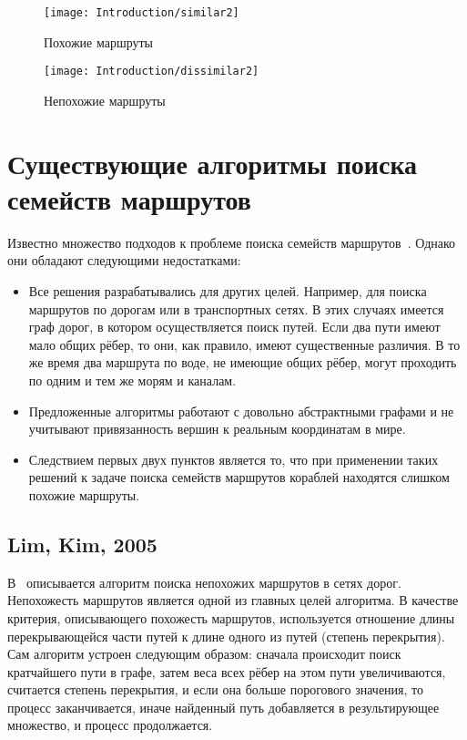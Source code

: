 \begin{figure}
    \texttt{[image: Introduction/similar2]}
    \caption{Похожие маршруты}
    \label{fig:similar-paths2}
\end{figure}

\begin{figure}
    \texttt{[image: Introduction/dissimilar2]}
    \caption{Непохожие маршруты}
    \label{fig:dissimilar-paths2}
\end{figure}

\FloatBarrier

\section{Существующие алгоритмы поиска семейств маршрутов}

\label{sec:existing-algos}

Известно множество подходов к проблеме поиска семейств
маршрутов~\cite{lim2005shortest, dial1971probabilistic, mafast}.
Однако они обладают следующими недостатками:
  
\begin{itemize}
    \item Все решения разрабатывались для других целей. Например, для
      поиска маршрутов по дорогам или в транспортных сетях. В этих
      случаях имеется граф дорог, в котором осуществляется поиск путей.
      Если два пути имеют мало общих рёбер, то они, как правило, имеют
      существенные различия. В то же время два маршрута по воде, не
      имеющие общих рёбер, могут проходить по одним и тем же морям и
      каналам.
    \item Предложенные алгоритмы работают с довольно абстрактными
      графами и не учитывают привязанность вершин к реальным координатам
      в мире.
    \item Следствием первых двух пунктов является то, что при
      применении таких решений к задаче поиска семейств маршрутов
      кораблей находятся слишком похожие маршруты.
\end{itemize}

\FloatBarrier

\subsection{Lim, Kim, 2005}

\label{subsec:lim-kim}

В~\cite{lim2005shortest} описывается алгоритм поиска непохожих
маршрутов в сетях дорог. Непохожесть маршрутов является одной из
главных целей алгоритма. В качестве критерия, описывающего похожесть
маршрутов, используется отношение длины перекрывающейся части путей к
длине одного из путей (степень перекрытия). Сам алгоритм устроен
следующим образом: сначала происходит поиск кратчайшего пути в графе,
затем веса всех рёбер на этом пути увеличиваются, считается степень
перекрытия, и если она больше порогового значения, то процесс
заканчивается, иначе найденный путь добавляется в результирующее
множество, и процесс продолжается.

